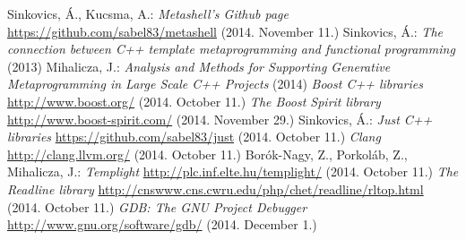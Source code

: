 \documentclass[a4paper,12pt]{report}
\begin{document}



\vspace*{\fill}
\begin{center}
\end{center}
\vfill
\thispagestyle{empty}
\newpage
\setcounter{page}{1}

\tableofcontents













\begin{thebibliography}{9}
    Sinkovics, Á., Kucsma, A.:
    \textit{Metashell's Github page}
    \url{https://github.com/sabel83/metashell} (2014. November 11.)
    Sinkovics, Á.:
    \textit{The connection between C++ template metaprogramming and functional
    programming} (2013)
    Mihalicza, J.:
    \textit{Analysis and Methods for Supporting Generative Metaprogramming in
    Large Scale C++ Projects} (2014)
    \textit{Boost C++ libraries}
    \url{http://www.boost.org/} (2014. October 11.)
    \textit{The Boost Spirit library}
    \url{http://www.boost-spirit.com/} (2014. November 29.)
    Sinkovics, Á.:
    \textit{Just C++ libraries}
    \url{https://github.com/sabel83/just} (2014. October 11.)
    \textit{Clang}
    \url{http://clang.llvm.org/} (2014. October 11.)
    Borók-Nagy, Z., Porkoláb, Z., Mihalicza, J.:
    \textit{Templight}
    \url{http://plc.inf.elte.hu/templight/} (2014. October 11.)
    \textit{The Readline library}
    \url{http://cnswww.cns.cwru.edu/php/chet/readline/rltop.html}
    (2014. October 11.)
    \textit{GDB: The GNU Project Debugger}
    \url{http://www.gnu.org/software/gdb/}
    (2014. December 1.)
\end{thebibliography}
\end{document}
